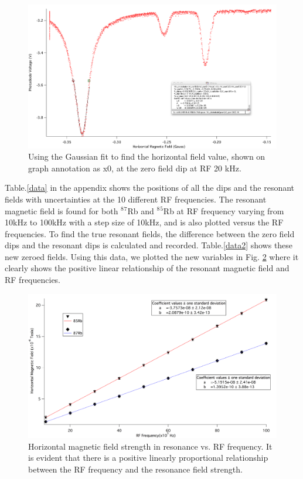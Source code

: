 \documentclass[prb,preprint]{revtex4-1}
\begin{document}
\begin{figure}[h]
\centering
\includegraphics[width=16cm]{gau}
\caption{Using the Gaussian fit to find the horizontal field value, shown on graph annotation as x0, at the zero field dip at RF 20 kHz.}
\label{gau}
\end{figure}


Table.\ref{data} in the appendix shows the positions of all the dips and the resonant fields with uncertainties at the 10 different RF frequencies. The resonant magnetic field is found for both $^8$$^7$Rb and $^8$$^5$Rb at RF frequency varying from 10kHz to 100kHz with a step size of 10kHz, and is also plotted versus the RF frequencies. To find the true resonant fields, the difference between the zero field dips and the resonant dips is calculated and recorded. Table.\ref{data2} shows these new zeroed fields. Using this data, we plotted the new variables in Fig. \ref{both} where it clearly shows the positive linear relationship of the resonant magnetic field and RF frequencies. \\


\begin{figure}[h]
\centering
\includegraphics[width=16cm]{slopegraph.png}
\caption{Horizontal magnetic field strength in resonance vs. RF frequency. It is evident that there is a positive linearly proportional relationship between the RF frequency and the resonance field strength. }
\label{both}
\end{figure}
\end{document}
